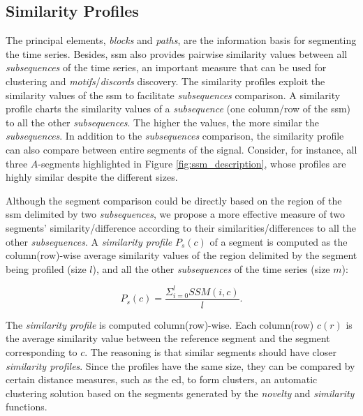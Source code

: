 \subsection{Similarity Profiles}
\label{sec:similarity_profiles}

The principal elements, \textit{blocks} and \textit{paths}, are the information basis for segmenting the time series. Besides, \gls{ssm} also provides pairwise similarity values between all \textit{subsequences} of the time series, an important measure that can be used for clustering and \textit{motifs}/\textit{discords} discovery. The similarity profiles exploit the similarity values of the \gls{ssm} to facilitate \textit{subsequences} comparison. 
A similarity profile charts the similarity values of a \textit{subsequence} (one column/row of the \gls{ssm}) to all the other \textit{subsequences}. The higher the values, the more similar the \textit{subsequences}. In addition to the \textit{subsequences} comparison, the similarity profile can also compare between entire segments of the signal. Consider, for instance, all three $A$-segments highlighted in Figure \ref{fig:ssm_description}, whose profiles are highly similar despite the different sizes. 

Although the segment comparison could be directly based on the region of the \gls{ssm} delimited by two \textit{subsequences}, we propose a more effective measure of two segments' similarity/difference according to their similarities/differences to all the other \textit{subsequences}. A \textit{similarity profile} $P_s(c)$ of a segment is computed as the column(row)-wise average similarity values of the region delimited by the segment being profiled (size $l$), and all the other \textit{subsequences} of the time series (size $m$):

\begin{equation}
P_s(c) = \frac{\Sigma_{i=0}^l SSM(i, c)}{l}.
\end{equation}

The \textit{similarity profile} is computed column(row)-wise. Each column(row) $c(r)$ is the average similarity value between the reference segment and the segment corresponding to $c$. The reasoning is that similar segments should have closer \textit{similarity profiles}. Since the profiles have the same size, they can be compared by certain distance measures, such as the \gls{ed}, to form clusters, an automatic clustering solution based on the segments generated by the \textit{novelty} and \textit{similarity} functions.

